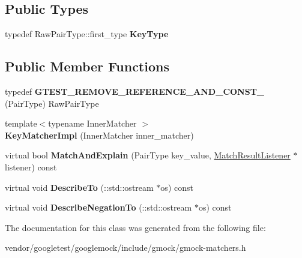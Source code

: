 \subsection*{Public Types}
\begin{DoxyCompactItemize}
\item 
typedef Raw\+Pair\+Type\+::first\+\_\+type {\bfseries Key\+Type}\hypertarget{classtesting_1_1internal_1_1KeyMatcherImpl_a9bd63b699518bd9868ba24766547667a}{}\label{classtesting_1_1internal_1_1KeyMatcherImpl_a9bd63b699518bd9868ba24766547667a}

\end{DoxyCompactItemize}
\subsection*{Public Member Functions}
\begin{DoxyCompactItemize}
\item 
typedef {\bfseries G\+T\+E\+S\+T\+\_\+\+R\+E\+M\+O\+V\+E\+\_\+\+R\+E\+F\+E\+R\+E\+N\+C\+E\+\_\+\+A\+N\+D\+\_\+\+C\+O\+N\+S\+T\+\_\+} (Pair\+Type) Raw\+Pair\+Type\hypertarget{classtesting_1_1internal_1_1KeyMatcherImpl_a006551fc32e5aef0d319a304ddc5f383}{}\label{classtesting_1_1internal_1_1KeyMatcherImpl_a006551fc32e5aef0d319a304ddc5f383}

\item 
{\footnotesize template$<$typename Inner\+Matcher $>$ }\\{\bfseries Key\+Matcher\+Impl} (Inner\+Matcher inner\+\_\+matcher)\hypertarget{classtesting_1_1internal_1_1KeyMatcherImpl_a9ad2a218b0366cae9fb09e82347bd8e7}{}\label{classtesting_1_1internal_1_1KeyMatcherImpl_a9ad2a218b0366cae9fb09e82347bd8e7}

\item 
virtual bool {\bfseries Match\+And\+Explain} (Pair\+Type key\+\_\+value, \hyperlink{classtesting_1_1MatchResultListener}{Match\+Result\+Listener} $\ast$listener) const \hypertarget{classtesting_1_1internal_1_1KeyMatcherImpl_afdf81c23c20be5825fe7a01d5e10a5cb}{}\label{classtesting_1_1internal_1_1KeyMatcherImpl_afdf81c23c20be5825fe7a01d5e10a5cb}

\item 
virtual void {\bfseries Describe\+To} (\+::std\+::ostream $\ast$os) const \hypertarget{classtesting_1_1internal_1_1KeyMatcherImpl_a47683b123c983c7fa9299f1da43b8033}{}\label{classtesting_1_1internal_1_1KeyMatcherImpl_a47683b123c983c7fa9299f1da43b8033}

\item 
virtual void {\bfseries Describe\+Negation\+To} (\+::std\+::ostream $\ast$os) const \hypertarget{classtesting_1_1internal_1_1KeyMatcherImpl_a45429cc899ff43b268aad48aa3ed0b12}{}\label{classtesting_1_1internal_1_1KeyMatcherImpl_a45429cc899ff43b268aad48aa3ed0b12}

\end{DoxyCompactItemize}


The documentation for this class was generated from the following file\+:\begin{DoxyCompactItemize}
\item 
vendor/googletest/googlemock/include/gmock/gmock-\/matchers.\+h\end{DoxyCompactItemize}
